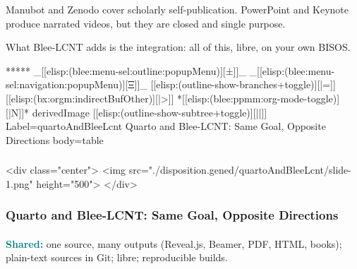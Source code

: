 \begin{whenOrg}
\begin{verblatex}
\begin{frame}[fragile,plain,label=priorArtBeyondEmacs]
{  Manubot and Zenodo cover scholarly self-publication. PowerPoint and Keynote
  produce narrated videos, but they are closed and single purpose.

  What Blee-LCNT adds is the integration: all of this, libre, on your own BISOS.
}

\end{frame}
\end{verblatex}


\begin{whenOrg}
*****  _[[elisp:(blee:menu-sel:outline:popupMenu)][±]]_ _[[elisp:(blee:menu-sel:navigation:popupMenu)][Ξ]]_ [[elisp:(outline-show-branches+toggle)][|=]] [[elisp:(bx:orgm:indirectBufOther)][|>]] *[[elisp:(blee:ppmm:org-mode-toggle)][|N]]*  derivedImage [[elisp:(outline-show-subtree+toggle)][||]] Label=quartoAndBleeLcnt Quarto and Blee-LCNT: Same Goal, Opposite Directions body=table
\end{whenOrg}

\begin{htmlonly}

\begin{frame}[fragile,plain,label=quartoAndBleeLcnt]
    \frametitle{}
    \framesubtitle{}
    \begin{rawhtml}
<div class="center">
<img src="./disposition.gened/quartoAndBleeLcnt/slide-1.png" height="500">
</div>
    \end{rawhtml}
\end{frame}
\end{htmlonly}

\begin{verblatex}

\begin{frame}[fragile,plain,label=quartoAndBleeLcnt]
    \frametitle{Quarto and Blee-LCNT: Same Goal, Opposite Directions}
    \framesubtitle{}

{\footnotesize
\textcolor{teal}{\textbf{Shared:}} one source, many outputs (Reveal.js, Beamer, PDF, HTML, books);
plain-text sources in Git; libre; reproducible builds.

}
\end{frame}
\end{verblatex}
\end{whenOrg}
